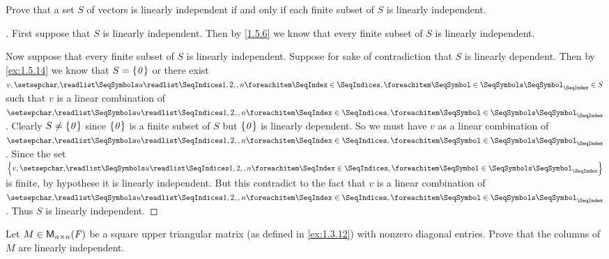 \begin{ex}\label{ex:1.5.16}
  Prove that a set \(S\) of vectors is linearly independent if and only if each finite subset of \(S\) is linearly independent.
\end{ex}

\begin{proof}[]
  First suppose that \(S\) is linearly independent.
  Then by \cref{1.5.6} we know that every finite subset of \(S\) is linearly independent.

  Now suppose that every finite subset of \(S\) is linearly independent.
  Suppose for sake of contradiction that \(S\) is linearly dependent.
  Then by \cref{ex:1.5.14} we know that \(S = \left\lbrace\mathit{0}\right\rbrace\) or there exist \(v, \seq{u}{1,2,,n} \in S\) such that \(v\) is a linear combination of \(\seq{u}{1,2,,n}\).
  Clearly \(S \neq \left\lbrace\mathit{0}\right\rbrace\) since \(\left\lbrace\mathit{0}\right\rbrace\) is a finite subset of \(S\) but \(\left\lbrace\mathit{0}\right\rbrace\) is linearly dependent.
  So we must have \(v\) as a linear combination of \(\seq{u}{1,2,,n}\).
  Since the set \(\set{v,\seq{u}{1,2,,n}}\) is finite, by hypothese it is linearly independent.
  But this contradict to the fact that \(v\) is a linear combination of \(\seq{u}{1,2,,n}\).
  Thus \(S\) is linearly independent.
\end{proof}

\begin{ex}\label{ex:1.5.17}
  Let \(M \in \mathsf{M}_{{n} \times n}({\mathit{F}})\) be a square upper triangular matrix (as defined in \cref{ex:1.3.12}) with nonzero diagonal entries.
  Prove that the columns of \(M\) are linearly independent.
\end{ex}

